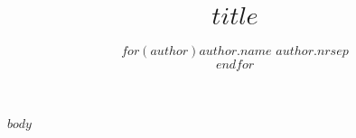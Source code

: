 \documentclass[12pt]{sprawozdanie}
\title{$title$}
\author{$for(author)$\textbf{$author.name$} $author.nr$$sep$\\$endfor$}
\begin{document}
\maketitle
$body$
\end{document}
